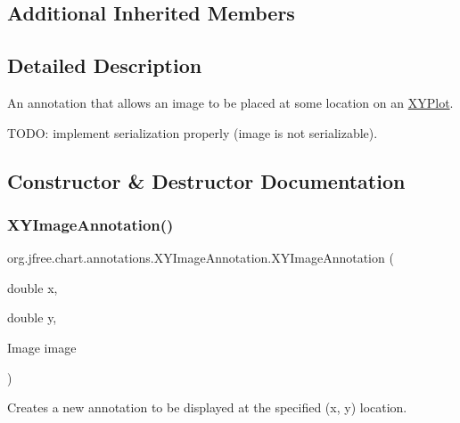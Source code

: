 \subsection*{Additional Inherited Members}


\subsection{Detailed Description}
An annotation that allows an image to be placed at some location on an \mbox{\hyperlink{}{X\+Y\+Plot}}.

T\+O\+DO\+: implement serialization properly (image is not serializable). 

\subsection{Constructor \& Destructor Documentation}
\mbox{\label{classorg_1_1jfree_1_1chart_1_1annotations_1_1_x_y_image_annotation_a29e84ffa5417925c2b760651d65240c7}} 
\subsubsection{\texorpdfstring{X\+Y\+Image\+Annotation()}{XYImageAnnotation()}\hspace{0.1cm}{\footnotesize\ttfamily [1/2]}}
{\footnotesize\ttfamily org.\+jfree.\+chart.\+annotations.\+X\+Y\+Image\+Annotation.\+X\+Y\+Image\+Annotation (\begin{DoxyParamCaption}\item[{double}]{x,  }\item[{double}]{y,  }\item[{Image}]{image }\end{DoxyParamCaption})}

Creates a new annotation to be displayed at the specified (x, y) location.


